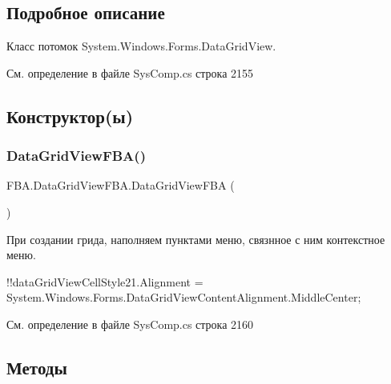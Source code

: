 \subsection{Подробное описание}
Класс потомок System.\+Windows.\+Forms.\+Data\+Grid\+View. 



См. определение в файле Sys\+Comp.\+cs строка 2155



\subsection{Конструктор(ы)}
\mbox{\label{class_f_b_a_1_1_data_grid_view_f_b_a_aa8298ce47b4a241d028f5221925151d6}} 
\subsubsection{\texorpdfstring{Data\+Grid\+View\+F\+B\+A()}{DataGridViewFBA()}}
{\footnotesize\ttfamily F\+B\+A.\+Data\+Grid\+View\+F\+B\+A.\+Data\+Grid\+View\+F\+BA (\begin{DoxyParamCaption}{ }\end{DoxyParamCaption})}



При создании грида, наполняем пунктами меню, связнное с ним контекстное меню. 

!!data\+Grid\+View\+Cell\+Style21.Alignment = System.\+Windows.\+Forms.\+Data\+Grid\+View\+Content\+Alignment.\+Middle\+Center; 

См. определение в файле Sys\+Comp.\+cs строка 2160



\subsection{Методы}
\mbox{\label{class_f_b_a_1_1_data_grid_view_f_b_a_a4388064e72c70819b06c2213c86aea9c}} 
